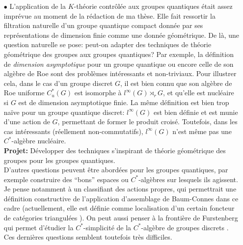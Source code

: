\documentclass[a4paper,11pt]{article}
\begin{document}
\begin{itemize}
Dans ce cas, nous pouvons montrer l'existence d'un projecteur de Kazdhan, aux propri\'et\'e si exotiques que, moyennant des renforcements \`a la propr\'et\'e T, ne peut pas se trouver dans l'image de l'application d'assemblage de Baum-Connes.\\

\textbf{Projet:} D\'ecrire avec plus de pr\'ecision les liens entre la propri\'et\'e T dynamique et l'obstruction \`a la conjecture de Baum-Connes.\\

Il semble probable de pouvoir prouver que la propri\'et\'e T dynamique constitue, moyennant des conditions suppl\'ementaires, une obstruction \`a l'exactitude en $K$-th\'eorie de certaines $C^*$-alg\`ebres, comme dans les exemples de Skandalis \cite{skandalis1988notion}. Des calculs d\'ej\`a effectu\'es sur des classes d'exemples confirment cette affirmation.\\

\item[$\bullet$] L'application de la $K$-th\'eorie contr\^ol\'ee aux groupes quantiques \'etait assez impr\'evue au moment de la r\'edaction de ma th\`ese. Elle fait ressortir la filtration naturelle d'un groupe quantique compact donn\'ee par ses repr\'esentations de dimension finie comme une donn\'ee g\'eom\'etrique. De l\`a, une question naturelle se pose: peut-on adapter des techniques de th\'eorie g\'eom\'etrique des groupes aux groupes quantiques? Par exemple, la d\'efinition de \textit{dimension asymptotique} pour un groupe quantique ou encore celle de son alg\`ebre de Roe sont des probl\`emes int\'eressants et non-triviaux. Pour illustrer cela, dans le cas d'un groupe discret $G$, il est bien connu que son alg\`ebre de Roe uniforme $C^*_u(G)$ est isomorphe \`a $l^\infty(G)\rtimes_r G$, et qu'elle est nucl\'eaire si $G$ est de dimension asymptotique finie. La m\^eme d\'efinition est bien trop na\"ive pour un groupe quantique discret: $l^\infty(G)$ est bien d\'efinie et est munie d'une action de $G$, permettant de former le produit crois\'e. Toutefois, dans les cas int\'eressants (r\'eellement non-commutatifs), $l^\infty(G)$ n'est m\^eme pas une $C^*$-alg\`ebre nucl\'eaire.  \\

\textbf{Projet:} D\'evelopper des techniques s'inspirant de th\'eorie g\'eom\'etrique des groupes pour les groupes quantiques.\\

D'autres questions peuvent \^etre abord\'ees pour les groupes quantiques, par exemple construire des ``bons'' espaces ou $C^*$-alg\`ebres sur lesquels ils agissent. Je pense notamment \`a un classifiant des actions propres, qui permettrait une d\'efinition constructive de l'application d'assemblage de Baum-Connes dans ce cadre (actuellement, elle est d\'efinie comme localisation d'un certain foncteur de cat\'egories triangul\'ees \cite{MeyerNest}). On peut aussi penser \`a la fronti\`ere de Furstenberg qui permet d'\'etudier la $C^*$-simplicit\'e de la $C^*$-alg\`ebre de groupes discrets \cite{kalantar2014boundaries}. Ces derni\`eres questions semblent toutefois tr\`es difficiles.\\ 


\end{itemize}
\end{document}
